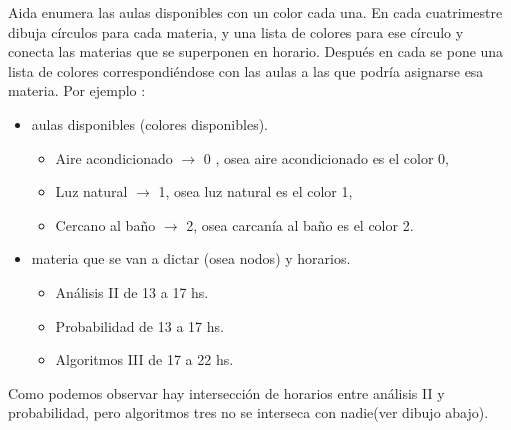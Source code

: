 \documentclass[a4paper]{article}
\begin{document}
Aida enumera las aulas disponibles con un color cada una. En cada cuatrimestre dibuja círculos para cada materia, y una lista de colores para ese círculo  y conecta las materias que se superponen en horario. Después en cada se pone una lista de colores correspondiéndose con las aulas a las que podría asignarse esa materia. \newline
Por ejemplo : 
\begin{itemize}
	\item aulas disponibles (colores disponibles).
	\begin{itemize}
		\item  Aire acondicionado $\rightarrow$ 0 , osea aire acondicionado es el color 0,
		\item  Luz natural $\rightarrow$ 1, osea luz natural es el color 1,
		\item  Cercano al baño $\rightarrow$ 2, osea carcanía al baño es el color 2.
	\end{itemize}
	\item materia que se van a dictar (osea nodos) y horarios.
	\begin{itemize}
		\item Análisis II de 13 a 17 hs.
		\item Probabilidad de 13 a 17 hs.
		\item Algoritmos III de 17 a 22 hs.
	\end{itemize}
\end{itemize}
Como podemos observar hay intersección de horarios entre análisis II y probabilidad, pero algoritmos tres no se interseca con nadie(ver dibujo abajo).
\end{document}
